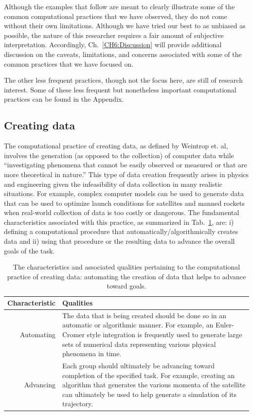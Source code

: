 \documentclass{msuphddissertation}
\begin{document}
\begin{doublespace}
Although the examples that follow are meant to clearly illustrate some of the common computational practices that we have observed, they do not come without their own limitations.  Although we have tried our best to as unbiased as possible, the nature of this researcher requires a fair amount of subjective interpretation.  Accordingly, Ch.~\ref{CH6:Discussion} will provide additional discussion on the caveats, limitations, and concerns associated with some of the common practices that we have focused on.

The other less frequent practices, though not the focus here, are still of research interest.  Some of these less frequent but nonetheless important computational practices can be found in the Appendix.

%
%
%
%
%
%
%
%
%
%
%
%
%
%
%
%

\subsection{Creating data}\label{CH5:SecCreatingData}

The computational practice of creating data, as defined by Weintrop et. al, involves the generation (as opposed to the collection) of computer data while ``investigating phenomena that cannot be easily observed or measured or that are more theoretical in nature.''  This type of data creation frequently arises in physics and engineering given the infeasibility of data collection in many realistic situations.  For example, complex computer models can be used to generate data that can be used to optimize launch conditions for satellites and manned rockets when real-world collection of data is too costly or dangerous.  The fundamental characteristics associated with this practice, as summarized in Tab.~\ref{CH5:CreatingData}, are: i) defining a computational procedure that automatically/algorithmically creates data and ii) using that procedure or the resulting data to advance the overall goals of the task.

\begin{table}[t]
\begin{tabular}{r|p{}}
Characteristic & Qualities \\\hline\hline
Automating & The data that is being created should be done so in an automatic or algorithmic manner.  For example, an Euler-Cromer style integration is frequently used to generate large sets of numerical data representing various physical phenomena in time.\\
Advancing & Each group should ultimately be advancing toward completion of the specified task.  For example, creating an algorithm that generates the various momenta of the satellite can ultimately be used to help generate a simulation of its trajectory.\\
\end{tabular}\caption{The characteristics and associated qualities pertaining to the computational practice of creating data: automating the creation of data that helps to advance toward goals.}\label{CH5:CreatingData}
\end{table}


\end{doublespace}
\end{document}
